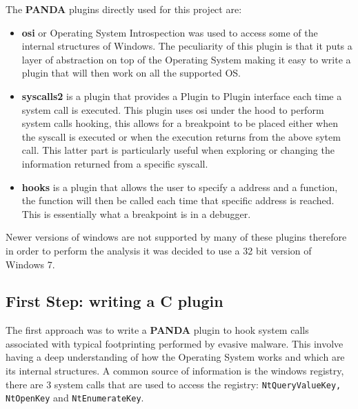 The \textbf{PANDA} plugins directly used for this project are: 

\begin{itemize}
    \item \textbf{osi} or Operating System Introspection was used to access some of the internal structures of Windows. The peculiarity of this plugin is that it puts a layer of abstraction on top of the Operating System making it easy to write a plugin that will then work on all the supported OS. 
    \item \textbf{syscalls2} is a plugin that provides a Plugin to Plugin interface each time a system call is executed. This plugin uses osi under the hood to perform system calls hooking, this allows for a breakpoint to be placed either when the syscall is executed or when the execution returns from the above sytem call. This latter part is particularly useful when exploring or changing the information returned from a specific syscall.
    
    \item \textbf{hooks} is a plugin that allows the user to specify a address and a function, the function will then be called each time that specific address is reached. This is essentially what a breakpoint is in a debugger.
    
\end{itemize}

Newer versions of windows are not supported by many of these plugins therefore in order to perform the analysis it was decided to use a 32 bit version of Windows 7.


\subsection{First Step: writing a C plugin}

The first approach was to write a \textbf{PANDA} plugin to hook system calls associated with typical footprinting performed by evasive malware. This involve having a deep understanding of how the Operating System works and which are its internal structures. A common source of information is the windows registry, there are 3 system calls that are used to access the registry: \lstinline{NtQueryValueKey, NtOpenKey} and \lstinline{NtEnumerateKey}. 

